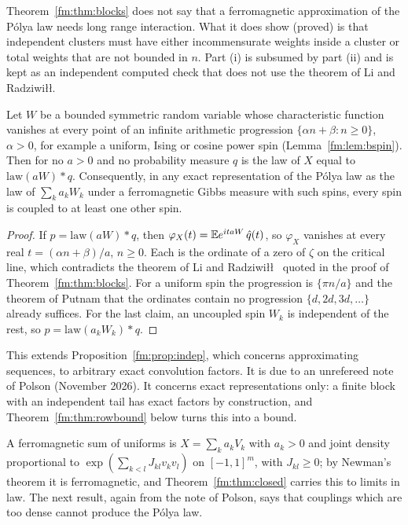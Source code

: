 Theorem~\ref{fm:thm:blocks} does not say that a ferromagnetic approximation of the P\'olya law needs long range interaction. What it does show (proved) is that independent clusters must have either incommensurate weights inside a cluster or total weights that are not bounded in $n$. Part (i) is subsumed by part (ii) and is kept as an independent computed check that does not use the theorem of Li and Radziwi\l\l.

\begin{proposition}[proved]\label{fm:prop:indecomp}
Let $W$ be a bounded symmetric random variable whose characteristic function vanishes at every point of an infinite arithmetic progression $\{\alpha n+\beta:n\ge0\}$, $\alpha>0$, for example a uniform, Ising or cosine power spin (Lemma~\ref{fm:lem:bspin}). Then for no $a>0$ and no probability measure $q$ is the law of $X$ equal to $\mathrm{law}(aW)*q$. Consequently, in any exact representation of the P\'olya law as the law of $\sum_ka_kW_k$ under a ferromagnetic Gibbs measure with such spins, every spin is coupled to at least one other spin.
\end{proposition}

\begin{proof}
If $p=\mathrm{law}(aW)*q$, then $\varphi_X(t)=\mathbb{E} e^{itaW}\,\hat q(t)$, so $\varphi_X$ vanishes at every real $t=(\alpha n+\beta)/a$, $n\ge0$. Each is the ordinate of a zero of $\zeta$ on the critical line, which contradicts the theorem of Li and Radziwi\l\l\ \cite{LiRad15} quoted in the proof of Theorem~\ref{fm:thm:blocks}. For a uniform spin the progression is $\{\pi n/a\}$ and the theorem of Putnam \cite{Putnam54} that the ordinates contain no progression $\{d,2d,3d,\dots\}$ already suffices. For the last claim, an uncoupled spin $W_k$ is independent of the rest, so $p=\mathrm{law}(a_kW_k)*q$.
\end{proof}

This extends Proposition~\ref{fm:prop:indep}, which concerns approximating sequences, to arbitrary exact convolution factors. It is due to an unrefereed note of Polson (November 2026). It concerns exact representations only: a finite block with an independent tail has exact factors by construction, and Theorem~\ref{fm:thm:rowbound} below turns this into a bound.

A ferromagnetic sum of uniforms is $X=\sum_ka_kV_k$ with $a_k>0$ and joint density proportional to $\exp(\sum_{k<l}J_{kl}v_kv_l)$ on $[-1,1]^m$, with $J_{kl}\ge0$; by Newman's theorem \cite{Newman74} it is ferromagnetic, and Theorem~\ref{fm:thm:closed} carries this to limits in law. The next result, again from the note of Polson, says that couplings which are too dense cannot produce the P\'olya law.

